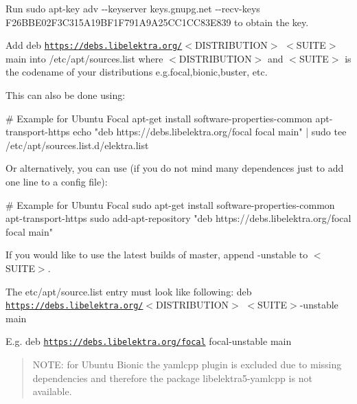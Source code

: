 \begin{DoxyEnumerate}
\item Run {\ttfamily sudo apt-\/key adv -\/-\/keyserver keys.\+gnupg.\+net -\/-\/recv-\/keys F26\+B\+B\+E02\+F3\+C315\+A19\+B\+F1\+F791\+A9\+A25\+C\+C1\+C\+C83\+E839} to obtain the key.
\item Add {\ttfamily deb \href{https://debs.libelektra.org/}{\tt https\+://debs.\+libelektra.\+org/}$<$D\+I\+S\+T\+R\+I\+B\+U\+T\+I\+ON$>$ $<$S\+U\+I\+TE$>$ main} into {\ttfamily /etc/apt/sources.list} where {\ttfamily $<$D\+I\+S\+T\+R\+I\+B\+U\+T\+I\+ON$>$} and {\ttfamily $<$S\+U\+I\+TE$>$} is the codename of your distributions e.\+g.{\ttfamily focal},{\ttfamily bionic},{\ttfamily buster}, etc.
\end{DoxyEnumerate}

This can also be done using\+:


\begin{DoxyCode}
# Example for Ubuntu Focal
apt-get install software-properties-common apt-transport-https
echo "deb https://debs.libelektra.org/focal focal main" | sudo tee /etc/apt/sources.list.d/elektra.list
\end{DoxyCode}


Or alternatively, you can use (if you do not mind many dependences just to add one line to a config file)\+:


\begin{DoxyCode}
# Example for Ubuntu Focal
sudo apt-get install software-properties-common apt-transport-https
sudo add-apt-repository "deb https://debs.libelektra.org/focal focal main"
\end{DoxyCode}


If you would like to use the latest builds of master, append {\ttfamily -\/unstable} to {\ttfamily $<$S\+U\+I\+TE$>$}.

The {\ttfamily etc/apt/source.\+list} entry must look like following\+: {\ttfamily deb \href{https://debs.libelektra.org/}{\tt https\+://debs.\+libelektra.\+org/}$<$D\+I\+S\+T\+R\+I\+B\+U\+T\+I\+ON$>$ $<$S\+U\+I\+TE$>$-\/unstable main}

E.\+g. {\ttfamily deb \href{https://debs.libelektra.org/focal}{\tt https\+://debs.\+libelektra.\+org/focal} focal-\/unstable main}

\begin{quote}
N\+O\+TE\+: for Ubuntu Bionic the yamlcpp plugin is excluded due to missing dependencies and therefore the package {\ttfamily libelektra5-\/yamlcpp} is not available. \end{quote}



